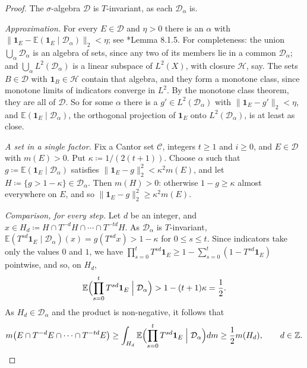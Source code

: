 \begin{proof}
The $\sigma$-algebra $\mathcal D$ is $T$-invariant, as each $\mathcal D_\alpha$ is.  

\emph{Approximation.}  For every $E \in \mathcal D$ and $\eta>0$ there is an $\alpha$ with 
$\lVert \mathbf 1_E - \mathbb E(\mathbf 1_E \mid \mathcal D_\alpha)\rVert_2 < \eta$; see \cite{MoreiraNotes}*{Lemma 8.1.5}.  
For completeness: the union $\bigcup_\alpha \mathcal D_\alpha$ is an algebra of sets, since any two of its members lie in a common $\mathcal D_\alpha$; 
and $\bigcup _\alpha L^2(\mathcal D_\alpha)$ is a linear subspace of $L^2(X)$, with closure $\mathcal H$, say.  
The sets $B \in \mathcal D$ with $\mathbf 1_B \in \mathcal H$ contain that algebra, and they form a monotone class, since monotone limits of indicators converge in $L^2$.  
By the monotone class theorem, they are all of $\mathcal D$.  So for some $\alpha$ there is a $g' \in L^2(\mathcal D_\alpha)$ with $\lVert \mathbf 1_E - g'\rVert_2 < \eta$, 
and $\mathbb E(\mathbf 1_E \mid \mathcal D_\alpha)$, the orthogonal projection of $\mathbf 1_E$ onto $L^2(\mathcal D_\alpha)$, is at least as close.  

\emph{A set in a single factor.}  Fix a Cantor set $\mathcal C$, integers $t \geq 1$ and $i \geq 0$, and $E \in \mathcal D$ with $m(E)>0$.  
Put $\kappa \coloneqq 1/(2(t+1))$.  Choose $\alpha$ such that $g \coloneqq \mathbb E(\mathbf 1_E \mid \mathcal D_\alpha)$ satisfies 
$\lVert \mathbf 1_E - g\rVert_2 ^2 < \kappa ^2 m(E)$, and let $H \coloneqq \{ g > 1-\kappa\} \in \mathcal D_\alpha$.  
Then $m(H)>0$: otherwise $1-g \geq \kappa$ almost everywhere on $E$, and so $\lVert \mathbf 1_E - g\rVert_2 ^2 \geq \kappa ^2 m(E)$.  

\emph{Comparison, for every step.}  Let $d$ be an integer, and $x \in H_d \coloneqq H \cap T ^{-d}H \cap \cdots \cap T ^{-td}H$.  
As $\mathcal D_\alpha$ is $T$-invariant, $\mathbb E(T ^{sd}\mathbf 1_E \mid \mathcal D_\alpha)(x) = g(T ^{sd}x) > 1-\kappa$ for $0 \leq s \leq t$.  
Since indicators take only the values $0$ and $1$, we have $\prod_{s=0}^t T ^{sd}\mathbf 1_E \geq 1 - \sum_{s=0}^t (1 - T ^{sd}\mathbf 1_E)$ pointwise, and so, on $H_d$, 
\begin{equation}
\mathbb E\Bigl( \prod_{s=0}^t T ^{sd}\mathbf 1_E \;\Big\vert\; \mathcal D_\alpha\Bigr) > 1 - (t+1) \kappa = \frac 12 . 
\end{equation}
As $H_d \in \mathcal D_\alpha$ and the product is non-negative, it follows that 
\begin{equation} \label{e:chainComparison}
m \bigl( E \cap T ^{-d}E \cap \cdots \cap T ^{-td}E \bigr) 
\geq \int_{H_d} \mathbb E\Bigl( \prod_{s=0}^t T ^{sd}\mathbf 1_E \;\Big\vert\; \mathcal D_\alpha\Bigr) dm 
\geq \frac 12 m(H_d) , \qquad d \in \mathbb Z . 
\end{equation}


\end{proof}
